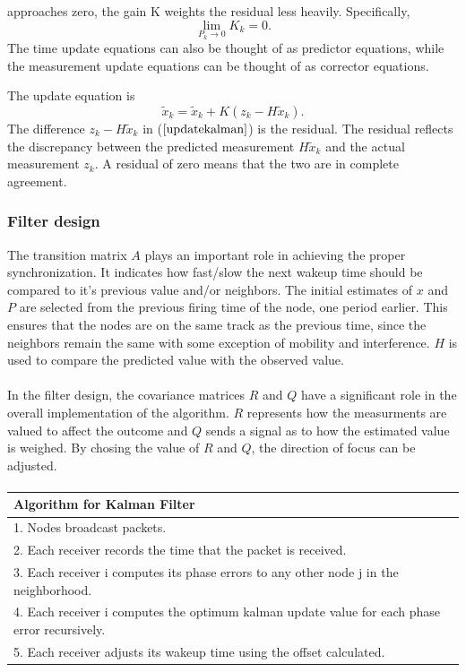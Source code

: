 \documentclass[a4paper,10pt]{report}
\begin{document}
approaches zero, the gain K weights the residual less heavily.
Specifically,
\begin{equation}
\mathop {\lim }\limits_{P_k \to 0 } {K_k} = 0.
\end{equation}
The time update equations can also be thought of as predictor
equations, while the measurement update equations can be thought of
as corrector equations.
\par
The update equation is
\begin{equation}
\tilde x_k = \tilde x_k + K(z_k-H\tilde x_k).
\label{updatekalman}
\end{equation}
The difference $z_k - H\tilde x_k$ in ($\ref{updatekalman}$) is the
residual. The residual reflects the discrepancy between the
predicted measurement $H\tilde x_k$ and the actual measurement
$z_k$. A residual of zero means that the two are in complete
agreement.
\subsubsection{Filter design}
The transition matrix $A$ plays an important role in achieving the
proper synchronization. It indicates how fast/slow the next wakeup
time should be compared to it's previous value and/or neighbors. The
initial estimates of $x$ and $P$ are selected from the previous
firing time of the node, one period earlier. This ensures that the
nodes are on the same track as the previous time, since the
neighbors remain the same with some exception of mobility and
interference. $H$ is used to compare the predicted value with the
observed value. \paragraph*{} In the filter design, the covariance
matrices $R$ and $Q$ have a significant role in the overall
implementation of the algorithm. $R$ represents how the measurments
are valued to affect the outcome and $Q$ sends a signal as to how
the estimated value is weighed. By chosing the value of $R$ and $Q$,
the direction of focus can be adjusted.
\paragraph*{}
\begin{tabular}{  l }Algorithm for Kalman Filter \\ \hline \hline
1. Nodes broadcast packets. \\  2. Each receiver records the time that the packet is received. \\
3. Each receiver i computes its phase errors to any other node j in the neighborhood. \\
4. Each receiver i computes the optimum kalman update value for each phase error recursively. \\
5. Each receiver adjusts its wakeup time using the offset calculated.\\
\hline \hline
\end{tabular}
\end{document}
